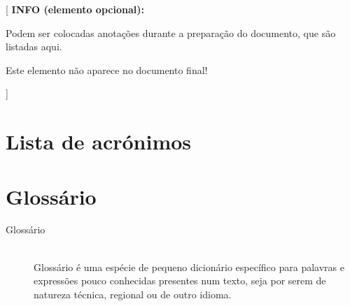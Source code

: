 \documentclass[11pt,a4paper]{report}
\newenvironment{infoopt}[1]{\vspace*{6mm}\color{blue}[ \textbf{INFO (elemento opcional):} \begin{em} #1}{\vspace*{3mm}\end{em} ]}
\begin{document}

\renewcommand{\contentsname}{Índice}

\tableofcontents


\listoftodos

\begin{infoopt}
Podem ser colocadas anotações durante a preparação do documento, que
são listadas aqui.

Este elemento não aparece no documento final!
\end{infoopt}


\chapter*{Lista de acrónimos}


\begin{acronym}[123] %
\end{acronym}


\chapter*{Glossário}

\begin{description}
\item[Glossário] \hfill \\
  Glossário é uma espécie de pequeno dicionário específico para
  palavras e expressões pouco conhecidas presentes num texto, seja
  por serem de natureza técnica, regional ou de outro idioma.
\end{description}

\end{document}
